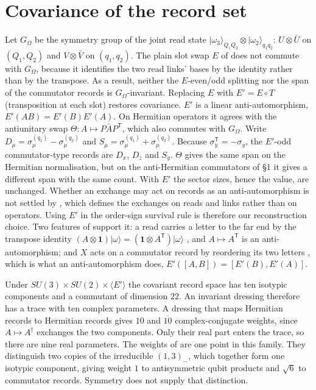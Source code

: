 \documentclass[11pt]{article}
\theoremstyle{remark}
\begin{document}
\section{Covariance of the record set}
Let $G_\Omega$ be the symmetry group of the joint read state $\lvert\omega_3\rangle_{Q_1Q_2}\otimes\lvert\omega_2\rangle_{q_1q_2}$: $U\otimes\bar U$ on $(Q_1,Q_2)$ and $V\otimes\bar V$ on $(q_1,q_2)$. The plain slot swap $E$ of \cite{wg} does not commute with $G_\Omega$, because it identifies the two read links' bases by the identity rather than by the transpose. As a result, neither the $E$-even/odd splitting nor the span of the commutator records is $G_\Omega$-invariant. Replacing $E$ with $E'=E\circ T$ (transposition at each slot) restores covariance. $E'$ is a linear anti-automorphism, $E'(AB)=E'(B)E'(A)$. On Hermitian operators it agrees with the antiunitary swap $\Theta:A\mapsto P\bar AP^{\mathsf T}$, which also commutes with $G_\Omega$. Write $D_\mu=\sigma_\mu^{(q_1)}-\sigma_\mu^{(q_2)}$ and $S_\mu=\sigma_\mu^{(q_1)}+\sigma_\mu^{(q_2)}$. Because $\sigma_y^{\mathsf T}=-\sigma_y$, the $E'$-odd commutator-type records are $D_x$, $D_z$ and $S_y$. $\Theta$ gives the same span on the Hermitian normalisation, but on the anti-Hermitian commutators of \S1 it gives a different span with the same count. With $E'$ the sector sizes, hence the value, are unchanged. Whether an exchange may act on records as an anti-automorphism is not settled by \cite{wg}, which defines the exchanges on reads and links rather than on operators. Using $E'$ in the order-sign survival rule is therefore our reconstruction choice. Two features of \cite{wg} support it: a read carries a letter to the far end by the transpose identity $(A\otimes\mathbf 1)\lvert\omega\rangle=(\mathbf 1\otimes A^{\mathsf T})\lvert\omega\rangle$ \cite[Sec.~S2]{wg}, and $A\mapsto A^{\mathsf T}$ is an anti-automorphism; and $X$ acts on a commutator record by reordering its two letters \cite[Sec.~S7]{wg}, which is what an anti-automorphism does, $E'([A,B])=[E'(B),E'(A)]$.

Under $SU(3)\times SU(2)\times\langle E'\rangle$ the covariant record space has ten isotypic components and a commutant of dimension $22$. An invariant dressing therefore has a trace with ten complex parameters. A dressing that maps Hermitian records to Hermitian records gives $10$ and $\overline{10}$ complex-conjugate weights, since $A\mapsto A^\dagger$ exchanges the two components. Only their real part enters the trace, so there are nine real parameters. The weights of \cite{wg} are one point in this family. They distinguish two copies of the irreducible $(1,3)_-$, which together form one isotypic component, giving weight $1$ to antisymmetric qubit products and $\sqrt6$ to commutator records. Symmetry does not supply that distinction.
\end{document}
